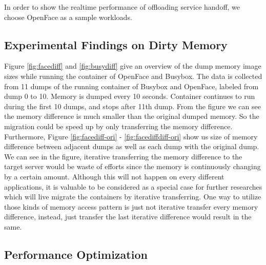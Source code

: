 In order to show the realtime performance of offloading service handoff, we choose OpenFace as a sample workloads.





\subsection{Experimental Findings on Dirty Memory}





Figure \ref{fig:facediff}
and  \ref{fig:busydiff} give an overview of the dump memory image sizes while running the container of OpenFace and Busybox. 
The data is collected from 11 dumps of the running container of Busybox and OpenFace, labeled from dump 0 to 10. Memory is dumped every 10 seconds. Container continues to run during the first 10 dumps, and stops after 11th dump. From the figure we can see the memory difference is much smaller than the original dumped memory. So the migration could be speed up by only  transferring the memory difference. Furthermore, Figure \ref{fig:facediff-ori} - \ref{fig:facediffdiff-ori} show us size of memory difference between adjacent dumps as well as each dump with the original dump. We can see in the figure, iterative transferring the memory difference to the target server would be waste of efforts since the memory is continuously changing by a certain amount. Although this will not happen on every different applications, it is valuable to be considered as a special case for further researches which will live migrate the containers by iterative transferring. One way to utilize those kinds of memory access pattern is just not iterative transfer every memory difference, instead, just transfer the last iterative difference would result in the same.



\subsection{Performance Optimization }

